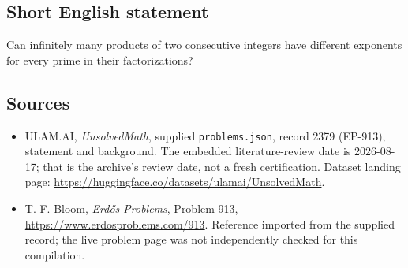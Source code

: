 \documentclass[11pt,a4paper]{article}
\begin{document}
\subsection{Short English statement}

Can infinitely many products of two consecutive integers have different exponents for every prime in their factorizations?

\subsection{Sources}

{\small

\begin{itemize}

\item[\hypertarget{source:2379:1}{S1}] ULAM.AI, \emph{UnsolvedMath}, supplied \texttt{problems.json}, record 2379 (EP-913), statement and background. The embedded literature-review date is 2026-08-17; that is the archive’s review date, not a fresh certification. Dataset landing page: \url{https://huggingface.co/datasets/ulamai/UnsolvedMath}.

\item[\hypertarget{source:2379:2}{S2}] T. F. Bloom, \emph{Erdős Problems}, Problem 913, \url{https://www.erdosproblems.com/913}. Reference imported from the supplied record; the live problem page was not independently checked for this compilation.

\end{itemize}

}

\label{end:2379}
\end{document}
